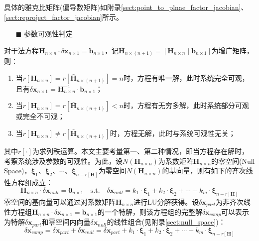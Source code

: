 具体的雅克比矩阵(偏导数矩阵)如附录\ref{sect:point_to_plnae_factor_jacobian}、\ref{sect:reproject_factor_jacobian}所示。

\begin{itemize}
  \item[$\blacksquare$]参数可观性判定
\end{itemize}

对于法方程$\boldsymbol{H}_{n\times n}\cdot\delta\boldsymbol{x}_{n\times 1}=\boldsymbol{b}_{n\times 1}$，记$\bar{\boldsymbol{H}}_{n\times (n+1)}=\left[\boldsymbol{H}_{n\times n}\mid \boldsymbol{b}_{n\times 1}\right]$为增广矩阵，则：
\begin{enumerate}
  \item 当$r[\boldsymbol{H}_{n\times n}]=r[\bar{\boldsymbol{H}}_{n\times (n+1)}]=n$时，方程有唯一解，此时系统完全可观，且有$\delta\boldsymbol{x}_{n\times 1}=\boldsymbol{H}^{-1}_{n\times n}\cdot\boldsymbol{b}_{n\times 1}$；

  \item 当$r[\boldsymbol{H}_{n\times n}]=r[\bar{\boldsymbol{H}}_{n\times (n+1)}]<n$时，方程有无穷多解，此时系统部分可观或完全不可观；

  \item 当$r[\boldsymbol{H}_{n\times n}]\ne r[\bar{\boldsymbol{H}}_{n\times (n+1)}]$时，方程无解，此时与系统可观性无关；
\end{enumerate}
其中$r[\cdot]$为求列秩运算。本文主要考量第一、第二种情况，即当方程存在解时，考察系统涉及参数的可观性。为此，设$N(\boldsymbol{H}_{n\times n})$为系数矩阵$\boldsymbol{H}_{n\times n}$的零空间(Null Space)，$\boldsymbol{\xi}_1$、$\boldsymbol{\xi}_2$、$\cdots$、$\boldsymbol{\xi}_{n-r[\boldsymbol{H}]}$为零空间$N(\boldsymbol{H}_{n\times n})$的基向量，则有如下的齐次线性方程组成立：
\begin{equation}
  \boldsymbol{H}_{n\times n}\cdot\delta\boldsymbol{x}_{null}=\boldsymbol{0}_{n\times 1}\quad\mathrm{s.t.}\quad \delta\boldsymbol{x}_{null}=k_1\cdot\boldsymbol{\xi}_1+k_2\cdot\boldsymbol{\xi}_2+\cdots+k_m\cdot\boldsymbol{\xi}_{n-r[\boldsymbol{H}]}
\end{equation}
零空间的基向量可以通过对系数矩阵$\boldsymbol{H}_{n\times n}$进行LU分解获得。设$\delta\boldsymbol{x}_{part}$为非齐次线性方程组$\boldsymbol{H}_{n\times n}\cdot\delta\boldsymbol{x}_{n\times 1}=\boldsymbol{b}_{n\times 1}$的一个特解，则该方程组的完整解$\delta\boldsymbol{x}_{comp}$可以表示为特解$\delta\boldsymbol{x}_{part}$和零空间内向量$\delta\boldsymbol{x}_{null}$的线性组合(见附录\ref{sect:null_space})：
\begin{equation}
  \delta\boldsymbol{x}_{comp}=\delta\boldsymbol{x}_{part}+\delta\boldsymbol{x}_{null}=\delta\boldsymbol{x}_{part}+k_1\cdot\boldsymbol{\xi}_1+k_2\cdot\boldsymbol{\xi}_2+\cdots+k_m\cdot\boldsymbol{\xi}_{n-r[\boldsymbol{H}]}
\end{equation}

